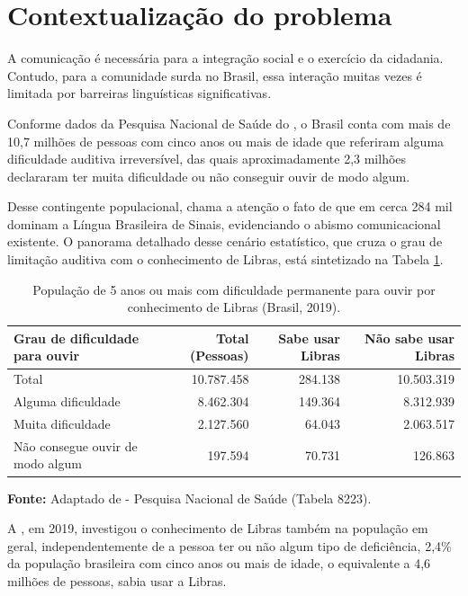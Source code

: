 \documentclass[
    12pt,                %
    openright,           %
    oneside,             %
    a4paper,             %
    english,             %
    brazil               %
]{abntex2}
\begin{document}
\section{Contextualização do problema}
\label{sec:contexto}

A comunicação é necessária para a integração social e o exercício da cidadania. Contudo, para a comunidade surda no Brasil, essa interação muitas vezes é limitada por barreiras linguísticas significativas.

Conforme dados da Pesquisa Nacional de Saúde do , o Brasil conta com mais de 10,7 milhões de pessoas com cinco anos ou mais de idade que referiram alguma dificuldade auditiva irreversível, das quais aproximadamente 2,3 milhões declararam ter muita dificuldade ou não conseguir ouvir de modo algum.

Desse contingente populacional, chama a atenção o fato de que em cerca 284 mil dominam a Língua Brasileira de Sinais, evidenciando o abismo comunicacional existente. O panorama detalhado desse cenário estatístico, que cruza o grau de limitação auditiva com o conhecimento de Libras, está sintetizado na Tabela \ref{tab:ibge_libras}.

\begin{table}[htbp]
\centering
\caption{População de 5 anos ou mais com dificuldade permanente para ouvir por conhecimento de Libras (Brasil, 2019).}
\label{tab:ibge_libras}
\small
\begin{tabularx}{\textwidth}{Xrrr}
\hline
\textbf{Grau de dificuldade para ouvir} & \textbf{Total (Pessoas)} & \textbf{Sabe usar Libras} & \textbf{Não sabe usar Libras} \\ \hline
Total & 10.787.458 & 284.138 & 10.503.319 \\
Alguma dificuldade & 8.462.304 & 149.364 & 8.312.939 \\
Muita dificuldade & 2.127.560 & 64.043 & 2.063.517 \\
Não consegue ouvir de modo algum & 197.594 & 70.731 & 126.863 \\ \hline
\end{tabularx}
\noindent\footnotesize{\newline \textbf{Fonte:} Adaptado de  - Pesquisa Nacional de Saúde (Tabela 8223).}
\end{table}

A , em 2019, investigou o conhecimento de Libras também na população em geral, independentemente de a pessoa ter ou não algum tipo de deficiência, 2,4\% da população brasileira com cinco anos ou mais de idade, o equivalente a 4,6 milhões de pessoas, sabia usar a Libras.
\end{document}
